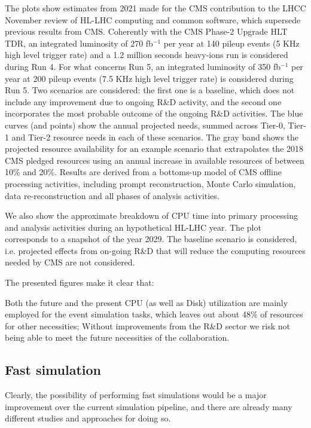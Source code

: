 The plots show estimates from 2021 made for the CMS contribution to the LHCC November review of HL-LHC computing and common software, which supersede previous results from CMS. Coherently with the CMS Phase-2 Upgrade HLT TDR, an integrated luminosity of 270 fb$^{-1}$ per year at 140 pileup events (5 KHz high level trigger rate) and a 1.2 million seconds heavy-ions run is considered during Run 4. For what concerns Run 5, an integrated luminosity of 350 fb$^{-1}$ per year at 200 pileup events (7.5 KHz high level trigger rate) is considered during Run 5. Two scenarios are considered: the first one is a baseline, which does not include any improvement due to ongoing R\&D activity, and the second one incorporates the most probable outcome of the ongoing R\&D activities. The blue curves (and points) show the annual projected needs, summed across Tier-0, Tier-1 and Tier-2 resource needs in each of these scenarios. The gray band shows the projected resource availability for an example scenario that extrapolates the 2018 CMS pledged resources using an annual increase in available resources of between 10$\%$ and 20$\%$. Results are derived from a bottoms-up model of CMS offline processing activities, including prompt reconstruction, Monte Carlo simulation, data re-reconstruction and all phases of analysis activities. 

We also show the approximate breakdown of CPU time into primary processing and analysis activities during an hypothetical HL-LHC year. The plot corresponds to a snapshot of the year 2029. The baseline scenario is considered, i.e. projected effects from on-going R\&D that will reduce the computing resources needed by CMS are not considered.

The presented figures make it clear that:

\begin{outline}
    \1 Both the future and the present CPU (as well as Disk) utilization are mainly employed for the event simulation tasks, which leaves out about 48$\%$ of resources for other necessities;
    \1 Without improvements from the R\&D sector we risk not being able to meet the future necessities of the collaboration.
\end{outline}


\subsection{Fast simulation}

Clearly, the possibility of performing fast simulations would be a major improvement over the current simulation pipeline, and there are already many different studies and approaches for doing so.

